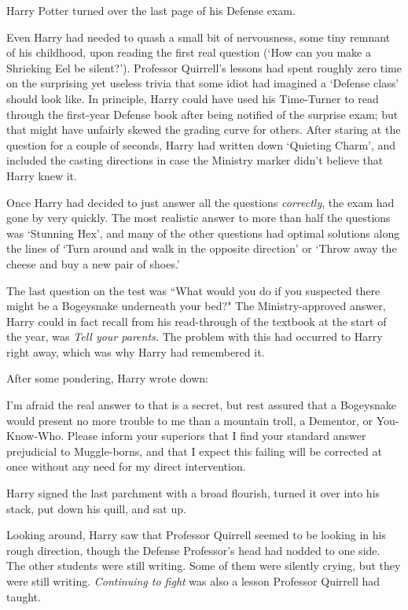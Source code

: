 \later

Harry Potter turned over the last page of his Defense exam.

Even Harry had needed to quash a small bit of nervousness, some tiny remnant of his childhood, upon reading the first real question (`How can you make a Shrieking Eel be silent?'). Professor Quirrell's lessons had spent roughly zero time on the surprising yet useless trivia that some idiot had imagined a `Defense class' should look like. In principle, Harry could have used his Time-Turner to read through the first-year Defense book after being notified of the surprise exam; but that might have unfairly skewed the grading curve for others. After staring at the question for a couple of seconds, Harry had written down `Quieting Charm', and included the casting directions in case the Ministry marker didn't believe that Harry knew it.

Once Harry had decided to just answer all the questions \emph{correctly}, the exam had gone by very quickly. The most realistic answer to more than half the questions was `Stunning Hex', and many of the other questions had optimal solutions along the lines of `Turn around and walk in the opposite direction' or `Throw away the cheese and buy a new pair of shoes.'

The last question on the test was ``What would you do if you suspected there might be a Bogeysnake underneath your bed?" The Ministry-approved answer, Harry could in fact recall from his read-through of the textbook at the start of the year, was \emph{Tell your parents.} The problem with this had occurred to Harry right away, which was why Harry had remembered it.

After some pondering, Harry wrote down:

\begin{writtenNote}
I'm afraid the real answer to that is a secret, but rest assured that a Bogeysnake would present no more trouble to me than a mountain troll, a Dementor, or You-Know-Who. Please inform your superiors that I find your standard answer prejudicial to Muggle-borns, and that I expect this failing will be corrected at once without any need for my direct intervention.
\end{writtenNote}

Harry signed the last parchment with a broad flourish, turned it over into his stack, put down his quill, and sat up.

Looking around, Harry saw that Professor Quirrell seemed to be looking in his rough direction, though the Defense Professor's head had nodded to one side. The other students were still writing. Some of them were silently crying, but they were still writing. \emph{Continuing to fight} was also a lesson Professor Quirrell had taught.

